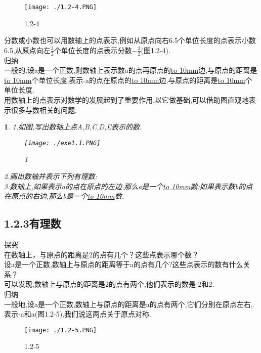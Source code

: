 \documentclass{article}
\newtheorem{exercise}{ }
\begin{document}
	\begin{figure}[ht!]
		\centering
		\texttt{[image: ./1.2-4.PNG]}
		\caption{1.2-4}
	\end{figure}
	\indent 分数或小数也可以用数轴上的点表示,例如从原点向右6.5个单位长度的点表示小数6.5,从原点向左$\frac{3}{2}$个单位长度的点表示分数$-\frac{3}{2}$(图1.2-4).\\
	
	归纳\\
	\indent 一般的,设a是一个正数,则数轴上表示数a的点再原点的\underline{\hbox to 10mm{}}边,与原点的距离是\underline{\hbox to 10mm{}}个单位长度;表示-a的点在原点的\underline{\hbox to 10mm{}}边,与原点的距离是\underline{\hbox to 10mm{}}个单位长度.\\
	\indent 用数轴上的点表示对数学的发展起到了重要作用,以它做基础,可以借助图直观地表示很多与数相关的问题.\\
	
	\begin{exercise}
		1.如图,写出数轴上点A,B,C,D,E表示的数.\\
		\begin{figure}[ht!]
			\centering
			\texttt{[image: ./exe1.1.PNG]}
			\caption{1}
		\end{figure}
		2.画出数轴并表示下列有理数:\\
		\indent
		3.数轴上,如果表示a的点在原点的左边,那么a是一个\underline{\hbox to 10mm{}}数;如果表示数b的点在原点的右边,那么b是一个\underline{\hbox to 10mm{}}数.\\
	\end{exercise}

	\subsection*{1.2.3有理数}
	探究\\
	\indent 在数轴上，与原点的距离是2的点有几个？这些点表示哪个数？\\
	设a是一个正数,数轴上与原点的距离等于a的点有几个?这些点表示的数有什么关系？\\
	\indent 可以发现,数轴上与原点的距离是2的点有两个,他们表示的数是-2和2.\\
	
	归纳\\
	\indent 一般地,设a是一个正数,数轴上与原点的距离是a的点有两个,它们分别在原点左右,表示-a和a(图1.2-5),我们说这两点关于原点对称.\\
	\begin{figure}[ht!]
		\centering
		\texttt{[image: ./1.2-5.PNG]}
		\caption{1.2-5}
	\end{figure}
	
\end{document}
